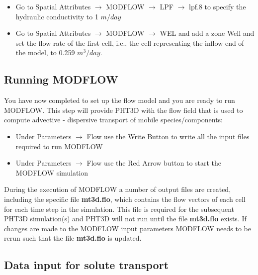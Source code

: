\begin{itemize}
\item Go to {\color{blue}Spatial Attributes} $\rightarrow$ {\color{blue}MODFLOW} $\rightarrow$ {\color{blue}LPF} $\rightarrow$ {\color{blue}lpf.8} to specify the hydraulic conductivity to 1 $m/day$

\item Go to {\color{blue}Spatial Attributes} $\rightarrow$ {\color{blue}MODFLOW} $\rightarrow$ {\color{blue}WEL} and add a zone {\color{blue}Well} and set the flow rate of the first cell, i.e., the cell representing the inflow end of the model, to 0.259 $m^3/day$.



\end{itemize}

\subsection{Running MODFLOW}

You have now completed to set up the flow model and you are ready to run MODFLOW.
This step will provide PHT3D with the flow field that is used to compute advective - dispersive
transport of mobile species/components:

\begin{itemize}

\item Under {\color{blue}Parameters} $\rightarrow$ {\color{blue}Flow} use the {\color{blue}Write Button} to write all the input files required to run MODFLOW

\item Under {\color{blue}Parameters} $\rightarrow$ {\color{blue}Flow} use the 
{\color{blue}Red Arrow} button to start the MODFLOW simulation

\end{itemize}

During the execution of MODFLOW a number of output files are created, including the specific file {\color{red} \textbf{mt3d.flo}}, which contains the flow vectors of each cell for each time step in the simulation. This file is required for the subsequent PHT3D simulation(s) and PHT3D will not run
until the file {\color{red} \textbf{mt3d.flo}} exists. If changes are made to the MODFLOW 
input parameters MODFLOW needs to be rerun such that the file {\color{red} \textbf{mt3d.flo}} is updated.

\subsection[Data input for solute transport]{Data input for solute transport}

